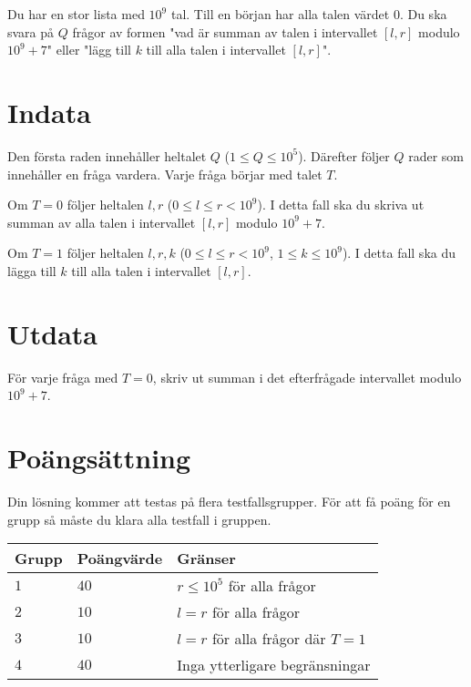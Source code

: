 Du har en stor lista med $10^9$ tal. Till en början har alla talen värdet $0$. Du ska svara på $Q$ frågor av formen "vad är summan av talen i intervallet $[l,r]$ modulo $10^9+7$" eller "lägg till $k$ till alla talen i intervallet $[l,r]$".

\section*{Indata}
Den första raden innehåller heltalet $Q$ ($1 \leq Q \leq 10^5$).
Därefter följer $Q$ rader som innehåller en fråga vardera. Varje fråga börjar med talet $T$.

Om $T=0$ följer heltalen $l,r$ ($0 \leq l \leq r < 10^9$). I detta fall ska du skriva ut summan av alla talen i intervallet $[l,r]$ modulo $10^9+7$.

Om $T=1$ följer heltalen $l,r,k$ ($0 \leq l \leq r < 10^9$, $1 \leq k \leq 10^9$). I detta fall ska du lägga till $k$ till alla talen i intervallet $[l,r]$.

\section*{Utdata}
För varje fråga med $T=0$, skriv ut summan i det efterfrågade intervallet modulo $10^9+7$.

\section*{Poängsättning}
Din lösning kommer att testas på flera testfallsgrupper.
\noindent
För att få poäng för en grupp så måste du klara alla testfall i gruppen.

\noindent
\begin{tabular}{| l | l | l |}
\hline
  Grupp & Poängvärde & Gränser \\ \hline
  $1$    & $40$       &  $r \leq 10^5$ för alla frågor \\ \hline
  $2$    & $10$       &  $l=r$ för alla frågor \\ \hline
  $3$    & $10$       &  $l=r$ för alla frågor där $T=1$ \\ \hline
  $4$    & $40$       &  Inga ytterligare begränsningar \\ \hline
\end{tabular}
